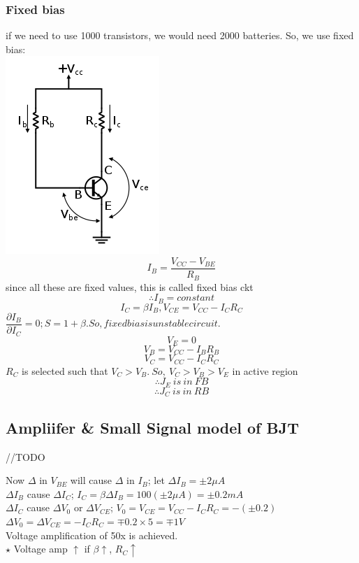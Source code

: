 \documentclass[10pt, a4paper]{report}
\begin{document}
	\subsubsection{Fixed bias}
	if we need to use 1000 transistors, we would need 2000 batteries. So, we use fixed bias:\\
	\includegraphics[width=0.5\linewidth]{img/fixed bias}\\
	$$ I_B = \dfrac{V_{CC}-V_{BE}}{R_B} $$
	since all these are fixed values, this is called fixed bias ckt
	$$ \therefore I_B = constant $$
	$$ I_C = \beta I_B, V_{CE} = V_{CC} - I_C R_C $$
	$ \dfrac{\partial I_B}{\partial I_{C}}  = 0; S = 1+\beta. So, fixed bias is unstable circuit.$
	$$ V_E = 0 $$
	$$ V_B = V_{CC} - I_B R_B $$
	$$ V_C = V_{CC} - I_C R_C $$
	$ R_C$ is selected such that $ V_C > V_B.\ So,\ V_C > V_B > V_E $ in active region
	$$ \therefore J_E\ is\ in\ FB $$
	$$ \therefore J_C\ is\ in\ RB $$
	
	\subsection{Ampliifer \& Small Signal model of BJT}
	//TODO
	
	Now $\Delta$ in $ V_{BE} $ will cause $\Delta$ in $ I_B $; let $ \Delta I_B = \pm 2\mu A $\\
	$ \Delta I_B $ cause $ \Delta I_C $; $ I_C = \beta \Delta I_B = 100(\pm 2 \mu A) = \pm 0.2mA $\\
	$ \Delta I_C $ cause $ \Delta V_0 $ or $ \Delta V_{CE} $; $ V_0 = V_{CE} = V_{CC} - I_C R_C = -(\pm 0.2) $\\
	$ \Delta V_0 = \Delta V_{CE} = -I_C R_C = \mp 0.2 \times 5 = \mp 1V $\\
	Voltage amplification of 50x is achieved.\\
	$\star$ Voltage amp $\uparrow$ if $\beta \uparrow$, $ R_C \uparrow $
	
\end{document}
